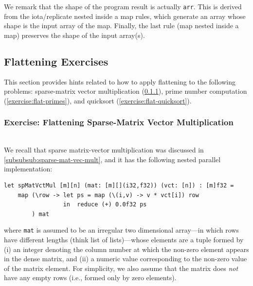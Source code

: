 \documentclass[acmsmall,review]{acmart}\settopmatter{printfolios=true,printccs=false,printacmref=false}
\begin{document}
We remark that the shape of the program result is actually 
{\tt arr}. This is derived from the iota/replicate nested inside a map rules,
which generate an array whose shape is the input array of the map. Finally,
the last rule (map nested inside a map) preserves the shape of the input array(s).

\subsection{Flattening Exercises}
\label{subsec:flat-exercises}

This section provides hints related to how to apply flattening to the following 
problems: sparse-matrix vector multiplication (\cref{exercise:flat-sp-mat-vec-mul}), 
prime number computation (\cref{exercise:flat-primes}), and 
quicksort (\cref{exercise:flat-quicksort}).

\subsubsection{Exercise: Flattening Sparse-Matrix Vector Multiplication}
\label{exercise:flat-sp-mat-vec-mul}
$\mbox{ }$\\

We recall that sparse matrix-vector multiplication was discussed in 
\cref{subsubsub:sparse-mat-vec-mult}, and it has the following nested
parallel implementation:
\begin{lstlisting}[mathescape=true]
let spMatVctMul [m][n] (mat: [m][](i32,f32)) (vct: [n]) : [m]f32 =
    map (\row -> let ps = map (\(i,v) -> v * vct[i]) row
                 in  reduce (+) 0.0f32 ps 
        ) mat
\end{lstlisting}\vspace{-2ex}
where {\tt mat} is assumed to be an irregular two dimensional array---in
which rows have different lengths (think list of lists)---whose elements
are a tuple formed by (i) an integer denoting the column number at which 
the non-zero element appears in the dense matrix, and (ii) a numeric value
corresponding to the non-zero value of the matrix element. For simplicity,
we also assume that the matrix does \emph{not} have any empty rows 
(i.e., formed only by zero elements).
\end{document}
